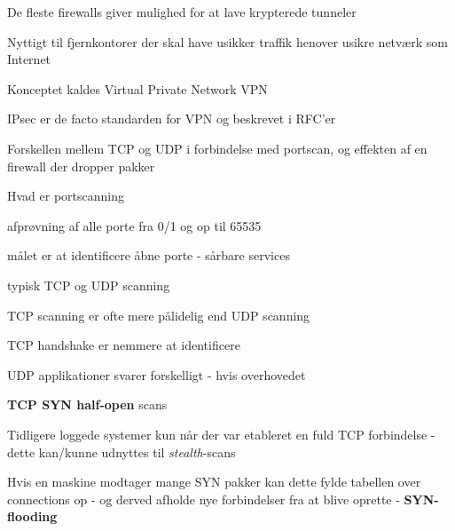 \documentclass[Screen16to9,17pt]{foils}
\begin{document}

\begin{list1}
\item De fleste firewalls giver mulighed for at lave krypterede
  tunneler
\item Nyttigt til fjernkontorer der skal have usikker traffik henover
  usikre netværk som Internet
\item Konceptet kaldes Virtual Private Network VPN
\item IPsec er de facto standarden for VPN og beskrevet i RFC'er
\end{list1}



Forskellen mellem TCP og UDP i forbindelse med portscan, og effekten af en firewall der dropper pakker


\begin{list1}
  \item Hvad er portscanning
\item afprøvning af alle porte fra 0/1 og op til 65535
\item målet er at identificere åbne porte - sårbare services
\item typisk TCP og UDP scanning
\item TCP scanning er ofte mere pålidelig end UDP scanning
\end{list1}

{\hlkbig TCP handshake er nemmere at identificere

UDP applikationer svarer forskelligt - hvis overhovedet}



\begin{list2}
\item {\bfseries TCP SYN half-open} scans
\item Tidligere loggede systemer kun når der var etableret en fuld TCP
  forbindelse - dette kan/kunne udnyttes til \emph{stealth}-scans
\item Hvis en maskine modtager mange SYN pakker kan dette fylde
  tabellen over connections op - og derved afholde nye forbindelser
  fra at blive oprette - {\bfseries SYN-flooding}
\end{list2}


\end{document}
